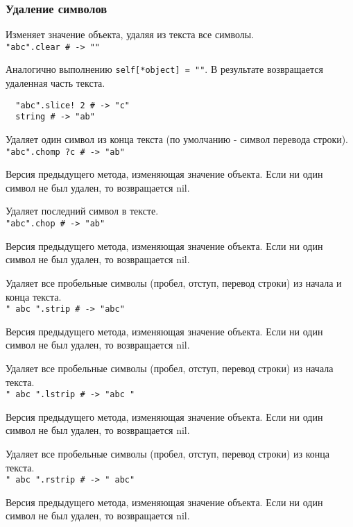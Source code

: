 \subsubsection*{Удаление символов}

\begin{methodlist}
  Изменяет значение объекта, удаляя из текста все символы.
  \\\verb!"abc".clear # -> ""!

  Аналогично выполнению \verb!self[*object] = ""!. В результате возвращается удаленная часть текста.
  \begin{verbatim}
  "abc".slice! 2 # -> "c"
  string # -> "ab"
  \end{verbatim}

  Удаляет один символ из конца текста (по умолчанию - символ перевода строки).
  \\\verb!"abc".chomp ?c # -> "ab"!

  Версия предыдущего метода, изменяющая значение объекта. Если ни один символ не был удален, то возвращается nil.

  Удаляет последний символ в тексте.
  \\\verb!"abc".chop # -> "ab"!

  Версия предыдущего метода, изменяющая значение объекта. Если ни один символ не был удален, то возвращается nil.

  Удаляет все пробельные символы (пробел, отступ, перевод строки) из начала и конца текста.
  \\\verb!" abc ".strip # -> "abc"!

  Версия предыдущего метода, изменяющая значение объекта. Если ни один символ не был удален, то возвращается nil.

  Удаляет все пробельные символы (пробел, отступ, перевод строки) из начала текста.
  \\\verb!" abc ".lstrip # -> "abc "!

  Версия предыдущего метода, изменяющая значение объекта. Если ни один символ не был удален, то возвращается nil.

  Удаляет все пробельные символы (пробел, отступ, перевод строки) из конца текста.
  \\\verb!" abc ".rstrip # -> " abc"!

  Версия предыдущего метода, изменяющая значение объекта. Если ни один символ не был удален, то возвращается nil.
\end{methodlist}

